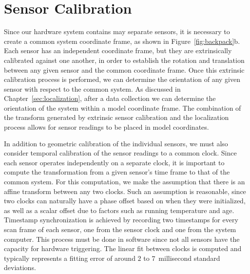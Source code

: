 \documentclass[12pt,onecolumn,oneside]{book}
\begin{document}
\section{Sensor Calibration}
\label{sec:calibration}

Since our hardware system contains may separate sensors, it is necessary to create a common system coordinate frame, as shown in Figure~\ref{fig:backpack}b.  Each sensor has an independent coordinate frame, but they are extrinsically calibrated against one another, in order to establish the rotation and translation between any given sensor and the common coordinate frame.  Once this extrinsic calibration process is performed, we can determine the orientation of any given sensor with respect to the common system.  As discussed in Chapter~\ref{sec:localization}, after a data collection we can determine the orientation of the system within a model coordinate frame.  The combination of the transform generated by extrinsic sensor calibration and the localization process allows for sensor readings to be placed in model coordinates.

In addition to geometric calibration of the individual sensors, we must also consider temporal calibration of the sensor readings to a common clock.  Since each sensor operates independently on a separate clock, it is important to compute the transformation from a given sensor's time frame to that of the common system.  For this computation, we make the assumption that there is an affine transform between any two clocks.  Such an assumption is reasonable, since two clocks can naturally have a phase offset based on when they were initialized, as well as a scalar offset due to factors such as running temperature and age.  Timestamp synchronization is achieved by recording two timestamps for every scan frame of each sensor, one from the sensor clock and one from the system computer.  This process must be done in software since not all sensors have the capacity for hardware triggering.  The linear fit between clocks is computed and typically represents a fitting error of around $2$ to $7$~millisecond standard deviations.

\end{document}
